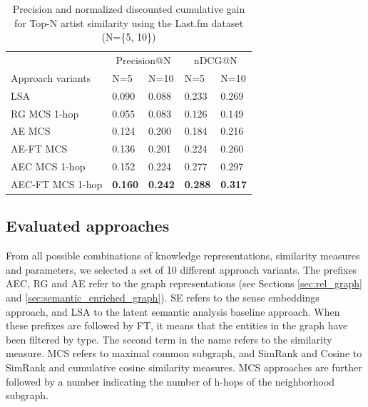 \begin{table}
\small
\centering
	\begin{tabular}{ lllll }
 	\toprule
	& \multicolumn{2}{c}{Precision@N} & \multicolumn{2}{c}{nDCG@N} \\
\cmidrule(lr){2-3}
 \cmidrule(lr){4-5}
	Approach variants & N=5 & N=10 & N=5 & N=10 \\
	\midrule
LSA & 0.090 & 0.088 & 0.233 & 0.269 \\
RG MCS 1-hop & 0.055 & 0.083 & 0.126 & 0.149 \\
AE MCS & 0.124 & 0.200 & 0.184 & 0.216 \\
AE-FT MCS & 0.136 & 0.201 & 0.224 & 0.260 \\
AEC MCS 1-hop & 0.152 & 0.224 & 0.277 & 0.297 \\
AEC-FT MCS 1-hop & \textbf{0.160} & \textbf{0.242} & \textbf{0.288} & \textbf{0.317} \\
\bottomrule
	\end{tabular}
	\caption{Precision and normalized discounted cumulative gain for Top-N artist similarity using the Last.fm dataset (N=\{5, 10\})}	
	\label{tbl:res_lastfm}
\end{table}
\subsection{Evaluated approaches}\label{sec:eval_approaches} %

From all possible combinations of knowledge representations, similarity measures and parameters, we selected a set of 10 different approach variants. The prefixes AEC, RG and AE refer to the graph representations (see Sections \ref{sec:rel_graph} and \ref{sec:semantic_enriched_graph}). %
SE refers to the sense embeddings approach, and LSA to the latent semantic analysis baseline approach. When these prefixes are followed by FT, it means that the entities in the graph have been filtered by type. The second term in the name refers to the similarity measure. MCS refers to maximal common subgraph, and SimRank and Cosine to SimRank and cumulative cosine similarity measures. MCS approaches are further followed by a number indicating the number of h-hops of the neighborhood subgraph.


